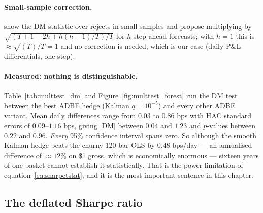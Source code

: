 \paragraph{Small-sample correction.} \cite{harvey1997evaluating} show the DM statistic
over-rejects in small samples and propose multiplying by
$\sqrt{(T+1-2h+h(h-1)/T)/T}$ for $h$-step-ahead forecasts; with $h=1$ this is
$\approx\sqrt{(T)/T}=1$ and no correction is needed, which is our case (daily P\&L
differentials, one-step).

\paragraph{Measured: nothing is distinguishable.}
Table~\ref{tab:multtest_dm} and Figure~\ref{fig:multtest_forest} run the DM test between
the best ADBE hedge (Kalman $q=10^{-5}$) and every other ADBE variant. Mean daily
differences range from $0.03$ to $0.86$ bps with HAC standard errors of $0.09$--$1.16$
bps, giving $|\mathrm{DM}|$ between $0.04$ and $1.23$ and $p$-values between $0.22$ and
$0.96$. \emph{Every} 95\% confidence interval spans zero. So although the smooth Kalman
hedge beats the churny 120-bar OLS by $0.48$ bps/day --- an annualised difference of
$\approx12$\% on \$1 gross, which is economically enormous --- sixteen years of one basket
cannot establish it statistically. That is the power limitation of
equation~\eqref{eq:sharpetstat}, and it is the most important sentence in this chapter.

\subsection{The deflated Sharpe ratio}
\label{sec:mt:dsr}

